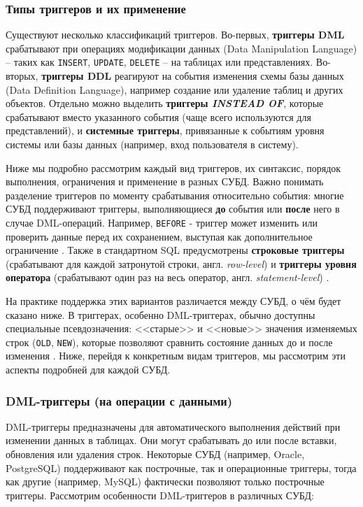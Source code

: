 \subsubsection{Типы триггеров и их применение}

 Существуют несколько классификаций триггеров. Во-первых, \textbf{триггеры DML} срабатывают при операциях модификации данных (Data Manipulation Language) – таких как \texttt{INSERT}, \texttt{UPDATE}, \texttt{DELETE} – на таблицах или представлениях. Во-вторых, \textbf{триггеры DDL} реагируют на события изменения схемы базы данных (Data Definition Language), например создание или удаление таблиц и других объектов. Отдельно можно выделить \textbf{триггеры \textit{INSTEAD OF}}, которые срабатывают вместо указанного события (чаще всего используются для представлений), и \textbf{системные триггеры}, привязанные к событиям уровня системы или базы данных (например, вход пользователя в систему). 
 
 Ниже мы подробно рассмотрим каждый вид триггеров, их синтаксис, порядок выполнения, ограничения и применение в разных СУБД. Важно понимать разделение триггеров по моменту срабатывания относительно события: многие СУБД поддерживают триггеры, выполняющиеся \textbf{до} события или \textbf{после} него в случае DML-операций. Например, \texttt{BEFORE} - триггер может изменить или проверить данные перед их сохранением, выступая как дополнительное ограничение \autocite{Silberschatz}. Также в стандартном SQL предусмотрены \textbf{строковые триггеры} (срабатывают для каждой затронутой строки, англ. \textit{row-level}) и \textbf{триггеры уровня оператора} (срабатывают один раз на весь оператор, англ. \textit{statement-level}) \autocite{Silberschatz}. 
 
 На практике поддержка этих вариантов различается между СУБД, о чём будет сказано ниже. В триггерах, особенно DML-триггерах, обычно доступны специальные псевдозначения: <<старые>> и <<новые>> значения изменяемых строк (\texttt{OLD}, \texttt{NEW}), которые позволяют сравнить состояние данных до и после изменения \autocite{Silberschatz}. Ниже, перейдя к конкретным видам триггеров, мы рассмотрим эти аспекты подробней для каждой СУБД.

\subsubsection{DML-триггеры (на операции с данными)}

 DML-триггеры предназначены для автоматического выполнения действий при изменении данных в таблицах. Они могут срабатывать до или после вставки, обновления или удаления строк. Некоторые СУБД (например, Oracle, PostgreSQL) поддерживают как построчные, так и операционные триггеры, тогда как другие (например, MySQL) фактически позволяют только построчные триггеры. Рассмотрим особенности DML-триггеров в различных СУБД:

